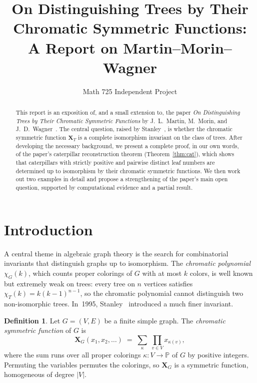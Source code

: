 \documentclass[11pt]{article}
\title{On Distinguishing Trees by Their Chromatic Symmetric Functions: \\
       \large A Report on Martin--Morin--Wagner}
\author{Math 725 Independent Project}
\date{}
\theoremstyle{definition}
\newtheorem{definition}[theorem]{Definition}
\newcommand{\X}{\mathbf{X}}
\newcommand{\PP}{\mathbb{P}}
\begin{document}
\maketitle

\begin{abstract}
This report is an exposition of, and a small extension to, the paper
\emph{On Distinguishing Trees by Their Chromatic Symmetric Functions}
by J.~L.~Martin, M.~Morin, and J.~D.~Wagner~\cite{MMW}.  The central
question, raised by Stanley~\cite{Stanley}, is whether the chromatic
symmetric function $\X_T$ is a complete isomorphism invariant on the
class of trees.  After developing the necessary background, we present
a complete proof, in our own words, of the paper's caterpillar
reconstruction theorem (Theorem~\ref{thm:cat}), which shows that
caterpillars with strictly positive and pairwise distinct leaf numbers
are determined up to isomorphism by their chromatic symmetric functions.
We then work out two examples in detail and propose a strengthening of
the paper's main open question, supported by computational evidence and
a partial result.
\end{abstract}

\section{Introduction}\label{sec:intro}

A central theme in algebraic graph theory is the search for combinatorial
invariants that distinguish graphs up to isomorphism.  The
\emph{chromatic polynomial} $\chi_G(k)$, which counts proper colorings of
$G$ with at most $k$ colors, is well known but extremely weak on trees:
every tree on $n$ vertices satisfies $\chi_T(k)=k(k-1)^{n-1}$, so the
chromatic polynomial cannot distinguish two non-isomorphic trees.
In~1995, Stanley~\cite{Stanley} introduced a much finer invariant.

\begin{definition}\label{def:csf}
Let $G=(V,E)$ be a finite simple graph.  The
\emph{chromatic symmetric function} of $G$ is
\[
   \X_G(x_1,x_2,\ldots) \;=\; \sum_{\kappa}\;\prod_{v\in V} x_{\kappa(v)},
\]
where the sum runs over all proper colorings $\kappa\colon V\to \PP$ of $G$
by positive integers.  Permuting the variables permutes the colorings,
so $\X_G$ is a symmetric function, homogeneous of degree $|V|$.
\end{definition}
\end{document}
